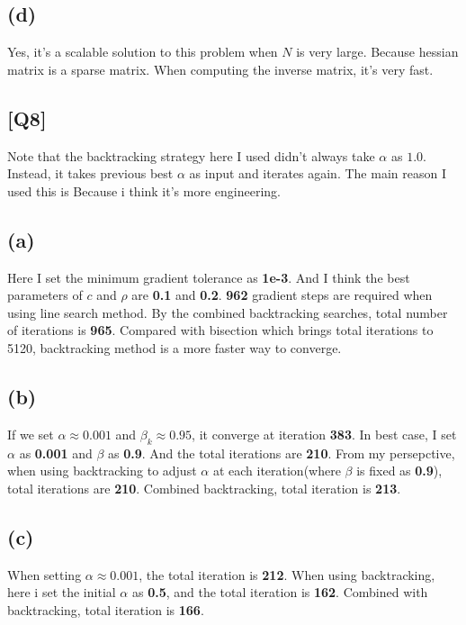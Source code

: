 \documentclass[12pt, a4 paper]{article}
\begin{document}
\begin{framed}
        \subsection{(d)}
        Yes, it's a scalable solution to this problem when $N$ is very large. Because hessian matrix is a sparse matrix. When computing the inverse matrix, it's very fast.
    \end{framed}

    \begin{framed}
        \section{[Q8]}
        Note that the backtracking strategy here I used didn't always
        take $\alpha$ as $1.0$. Instead, it takes previous best $\alpha$
        as input and iterates again. The main reason I used this is Because
        i think it's more engineering. 
        \subsection{(a)}
        Here I set the minimum gradient tolerance as \textbf{1e-3}. And I think the best parameters
         of $c$ and $\rho$ are \textbf{0.1} and \textbf{0.2}. \textbf{962} 
         gradient steps are required when using line search method. By the combined
          backtracking searches, total number of iterations is \textbf{965}. Compared 
          with bisection which brings total iterations to 5120, backtracking 
          method is a more faster way to converge.

        \subsection{(b)}
        If we set $\alpha \approx 0.001$ and $\beta_{k} \approx 0.95$, it converge at iteration
        \textbf{383}. In best case, I set $\alpha$ as \textbf{0.001} and $\beta$ as \textbf{0.9}. 
        And the total iterations are \textbf{210}. From my persepctive, when using backtracking 
        to adjust $\alpha$ at each iteration(where $\beta$ is fixed as \textbf{0.9}), total 
        iterations are \textbf{210}. Combined backtracking, total iteration is \textbf{213}.

        \subsection{(c)}
        When setting $\alpha \approx 0.001$, the total iteration is \textbf{212}. When using
         backtracking, here i set the initial $\alpha$ as \textbf{0.5}, and the total 
         iteration is \textbf{162}. Combined with backtracking, total iteration is
         \textbf{166}.


\end{framed}
\end{document}
